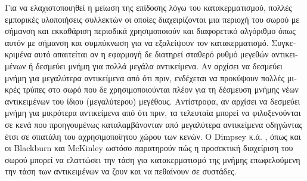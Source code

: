 \begin{greek}
Για να ελαχιστοποιηθεί η μείωση της επίδοσης λόγω του κατακερματισμού,
πολλές εμπορικές υλοποιήσεις συλλεκτών οι οποίες διαχειρίζονται
μια περιοχή του σωρού με σήμανση και εκκαθάριση περιοδικά χρησιμοποιούν
και διαφορετικό αλγόριθμο όπως αυτόν με σήμανση και συμπύκνωση για
να εξαλείψουν τον κατακερματισμό. Συγκεκριμένα αυτό απαιτείται
αν η εφαρμογή δε διατηρεί σταθερό ρυθμό μεγεθών αντικειμένων ή
δεσμεύει μνήμη για πολλά μεγάλα αντικείμενα. Αν αρχίσει να δεσμεύει
μνήμη για μεγαλύτερα αντικείμενα από ότι πριν, ενδέχεται να προκύψουν
πολλές μικρές τρύπες στο σωρό που δε χρησιμοποιούνται πλέον για
τη δέσμευση μνήμης νέων αντικειμένων του ίδιου (μεγαλύτερου)
μεγέθους. Αντίστροφα, αν αρχίσει να δεσμεύει μνήμη για μικρότερα
αντικείμενα από ότι πριν, τα τελευταία μπορεί να φιλοξενούνται
σε κενά που προηγουμένως καταλαμβάνονταν από μεγαλύτερα αντικείμενα
οδηγώντας έτσι σε σπατάλη του αχρησιμοποίητου χώρου των κενών. 
Ο Dimpsey κ.ά. \cite{DBLP:journals/ibmsj/DimpseyAK00}, όπως και
οι Blackburn και McKinley \cite{DBLP:conf/pldi/BlackburnM08}
ωστόσο παρατηρούν πώς η προσεκτική διαχείριση του σωρού μπορεί
να ελαττώσει την τάση για κατακερματισμό της μνήμης επωφελούμενη
την τάση των αντικειμένων να ζουν και να πεθαίνουν σε συστάδες.

\end{greek}
